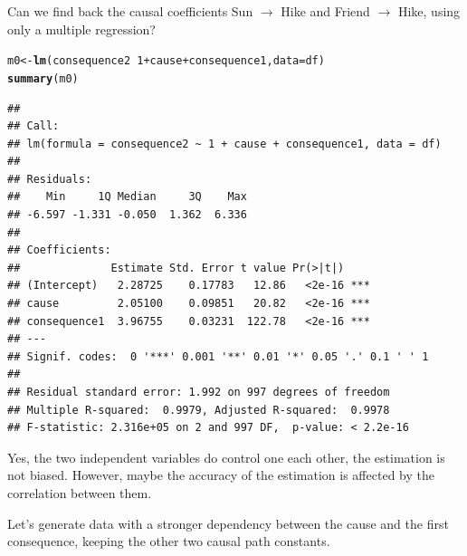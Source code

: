 \documentclass{article}\usepackage[]{graphicx}\usepackage[]{color}
\makeatletter
\newcommand{\hlnum}[1]{\textcolor[rgb]{0.686,0.059,0.569}{#1}}%
\newcommand{\hlopt}[1]{\textcolor[rgb]{0,0,0}{#1}}%
\newcommand{\hlstd}[1]{\textcolor[rgb]{0.345,0.345,0.345}{#1}}%
\newcommand{\hlkwb}[1]{\textcolor[rgb]{0.69,0.353,0.396}{#1}}%
\newcommand{\hlkwc}[1]{\textcolor[rgb]{0.333,0.667,0.333}{#1}}%
\newcommand{\hlkwd}[1]{\textcolor[rgb]{0.737,0.353,0.396}{\textbf{#1}}}%
\newenvironment{kframe}{%
 \def\at@end@of@kframe{}%
 \ifinner\ifhmode%
  \def\at@end@of@kframe{\end{minipage}}%
  \begin{minipage}{\columnwidth}%
 \fi\fi%
 \def\FrameCommand##1{\hskip\@totalleftmargin \hskip-\fboxsep
 \colorbox{shadecolor}{##1}\hskip-\fboxsep
     \hskip-\linewidth \hskip-\@totalleftmargin \hskip\columnwidth}%
 \MakeFramed {\advance\hsize-\width
   \@totalleftmargin\z@ \linewidth\hsize
   \@setminipage}}%
 {\par\unskip\endMakeFramed%
 \at@end@of@kframe}
\newenvironment{knitrout}{}{} %
\makeatother
\begin{document}
Can we find back the causal coefficients Sun $\rightarrow$ Hike and Friend $\rightarrow$ Hike, using only a multiple regression?


\begin{knitrout}
\color{fgcolor}\begin{kframe}
\begin{alltt}
\hlstd{m0}\hlkwb{<-}\hlkwd{lm}\hlstd{(consequence2}\hlopt{~}\hlnum{1}\hlopt{+}\hlstd{cause}\hlopt{+}\hlstd{consequence1,}\hlkwc{data}\hlstd{=df)}
\hlkwd{summary}\hlstd{(m0)}
\end{alltt}
\begin{verbatim}
## 
## Call:
## lm(formula = consequence2 ~ 1 + cause + consequence1, data = df)
## 
## Residuals:
##    Min     1Q Median     3Q    Max 
## -6.597 -1.331 -0.050  1.362  6.336 
## 
## Coefficients:
##              Estimate Std. Error t value Pr(>|t|)    
## (Intercept)   2.28725    0.17783   12.86   <2e-16 ***
## cause         2.05100    0.09851   20.82   <2e-16 ***
## consequence1  3.96755    0.03231  122.78   <2e-16 ***
## ---
## Signif. codes:  0 '***' 0.001 '**' 0.01 '*' 0.05 '.' 0.1 ' ' 1
## 
## Residual standard error: 1.992 on 997 degrees of freedom
## Multiple R-squared:  0.9979,	Adjusted R-squared:  0.9978 
## F-statistic: 2.316e+05 on 2 and 997 DF,  p-value: < 2.2e-16
\end{verbatim}
\end{kframe}
\end{knitrout}

Yes, the two independent variables do control one each other, the estimation is not biased. However, maybe the accuracy of the estimation is affected by the correlation between them.

Let's generate data with a stronger dependency between the cause and the first consequence, keeping the other two causal path constants.
\end{document}

